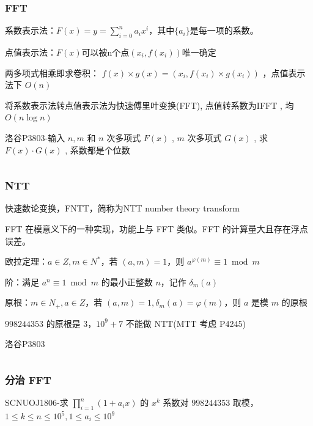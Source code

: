 \documentclass[twocolumn,10pt]{ctexart}
\begin{document}
\subsubsection{FFT}

系数表示法：$F(x)=y=\sum_{i=0}^na_ix^i$，其中$\{a_i\}$是每一项的系数。

点值表示法：$F(x)$可以被n个点$(x_i,f(x_i))$唯一确定

两多项式相乘即求卷积： $f(x)\times g(x)={(x_i,\allowbreak{}f(x_i)\times g(x_i))}$ ，点值表示法下 $O(n)$

将系数表示法转点值表示法为快速傅里叶变换(FFT), 点值转系数为IFFT , 均 $O(n\log n)$

\begin{notebox}
洛谷P3803-输入 $n,m$ 和 $n$ 次多项式 $F(x)$ , $m$ 次多项式 $G(x)$ , 求 $F(x)\cdot G(x)$ , 系数都是个位数
\end{notebox}

\inputminted{cpp}{code/p3803_fft.cpp}

\subsubsection{NTT}

快速数论变换，FNTT，简称为NTT number theory transform

FFT 在模意义下的一种实现，功能上与 FFT 类似。FFT 的计算量大且存在浮点误差。

欧拉定理：$a\in Z,m\in N^*$，若 $(a,m)=1$，则 $a^{\varphi(m)}\equiv 1\bmod m$

阶：满足 $a^n\equiv1\bmod m$ 的最小正整数 $n$，记作 $\delta_m(a)$

原根：$m\in N_+,a\in Z$，若 $(a,m)=1,\delta_m(a)=\varphi(m)$，则 $a$ 是模 $m$ 的原根

$998244353$ 的原根是 $3$，$10^9+7$ 不能做 NTT(MTT 考虑 P4245)

\begin{notebox}
洛谷P3803
\end{notebox}

\inputminted{cpp}{code/p3803_ntt.cpp}

\subsubsection{分治 FFT}

\begin{notebox}
SCNUOJ1806-求 $\prod_{i=1}^n(1+a_ix)$ 的 $x^k$ 系数对 $998244353$ 取模，$1\le k\le n\le10^5,\allowbreak{}1\le a_i\le10^9$
\end{notebox}
\end{document}
